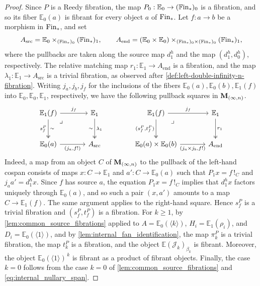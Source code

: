 \documentclass[10pt,reqno]{amsart}
\begin{document}
\begin{proof}
Since $P$ is a Reedy fibration, the map
$P_0:\mathbb E_0\to(\mathbb{F}\mathrm{in}_*)_0$ is a fibration, and so its fiber
$\mathbb E_0(a)$ is fibrant for every object $a$ of $\mathrm{Fin}_*$. Let
$f:a\to b$ be a morphism in $\mathrm{Fin}_*$, and set
\[
A_{\mathrm{src}}=\mathbb E_0\times_{(\mathbb{F}\mathrm{in}_*)_0}(\mathbb{F}\mathrm{in}_*)_1,
\qquad
A_{\mathrm{end}}=(\mathbb E_0\times\mathbb E_0)
\times_{(\mathbb{F}\mathrm{in}_*)_0\times(\mathbb{F}\mathrm{in}_*)_0}(\mathbb{F}\mathrm{in}_*)_1,
\]
where the pullbacks are taken along the source map $d_1^h$ and the
map $(d_1^h,d_0^h)$, respectively. The relative matching map
$r_1:\mathbb E_1\to A_{\mathrm{end}}$ is a fibration, and the map
$\lambda_1:\mathbb E_1\to A_{\mathrm{src}}$ is a trivial fibration,
as observed after \cref{def:left-double-infinity-n-fibration}. Writing
$j_a,j_b,j_f$ for the inclusions of the fibers
$\mathbb E_0(a),\mathbb E_0(b),\mathbb E_1(f)$ into
$\mathbb E_0,\mathbb E_0,\mathbb E_1$, respectively, we have the
following pullback squares in $\mathbf M_{(\infty,n)}$.
\[
\begin{tikzcd}[ampersand replacement=\&, sep=large]
\mathbb E_1(f)\arrow[r,"j_f"]
  \arrow[d,two heads,"s_f^P"',"\sim"]
  \arrow[dr,phantom,"\lrcorner",very near start]
\&\mathbb E_1\arrow[d,two heads,"\lambda_1","\sim"']\\
\mathbb E_0(a)\arrow[r,"{(j_a,f!)}"']\&A_{\mathrm{src}}
\end{tikzcd}
\qquad \qquad
\begin{tikzcd}[ampersand replacement=\&, sep=large]
\mathbb E_1(f)\arrow[r,"j_f"]
  \arrow[d,two heads,"{(s_f^P,t_f^P)}"']
  \arrow[dr,phantom,"\lrcorner",very near start]
\&\mathbb E_1\arrow[d,two heads,"r_1"]\\
\mathbb E_0(a)\times\mathbb E_0(b)
  \arrow[r,"{(j_a\times j_b,f!)}"']\&A_{\mathrm{end}}
\end{tikzcd}
\]
Indeed, a map from an object $C$ of $\mathbf M_{(\infty,n)}$ to the pullback of
the left-hand cospan consists of maps $x:C\to\mathbb E_1$ and
$a':C\to\mathbb E_0(a)$ such that $P_1x=f\,!_C$ and
$j_aa'=d_1^hx$. Since $f$ has source $a$, the equation
$P_1x=f\,!_C$ implies that $d_1^hx$ factors uniquely through
$\mathbb E_0(a)$, and so such a pair $(x,a')$ amounts to a map
$C\to\mathbb E_1(f)$. The same argument applies to the right-hand
square. Hence $s_f^P$ is a trivial fibration and $(s_f^P,t_f^P)$
is a fibration. For $k\geq1$, by \cref{lem:common_source_fibrations}
applied to $A=\mathbb E_0(\langle k\rangle)$,
$H_i=\mathbb E_1(\rho_i)$, and $D_i=\mathbb E_0(\langle1\rangle)$,
and by \cref{lem:internal_fan_identification}, the map $\pi_k^P$ is
a trivial fibration, the map $t_k^P$ is a fibration, and the object
$\mathbb E(\mathcal J_k)_{\beta_k}$ is fibrant. Moreover, the object
$\mathbb E_0(\langle1\rangle)^{\,k}$ is fibrant as a product of
fibrant objects. Finally, the case $k=0$ follows from the case
$k=0$ of \cref{lem:common_source_fibrations} and
\eqref{eq:internal_nullary_span}.
\end{proof}
\end{document}
